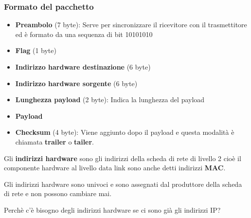 \documentclass[a4paper]{article}
\begin{document}
\subsubsection{Formato del pacchetto}
\label{05-12-D1}
\begin{itemize}
  \item \textbf{Preambolo} (7 byte): Serve per sincronizzare il ricevitore con il trasmettitore
    ed è formato da una sequenza di bit 10101010
  \item \textbf{Flag} (1 byte) 
  \item \textbf{Indirizzo hardware destinazione} (6 byte)
  \item \textbf{Indirizzo hardware sorgente} (6 byte)
  \item \textbf{Lunghezza payload} (2 byte): Indica la lunghezza del payload
  \item \textbf{Payload}
  \item \textbf{Checksum} (4 byte): Viene aggiunto dopo il payload e questa modalità
    è chiamata \textbf{trailer} o \textbf{tailer}.
\end{itemize}

\begin{definition}
  Gli \textbf{indirizzi hardware} sono gli indirizzi della scheda di rete di livello 2 
  cioè il componente hardware al livello data link sono anche detti indirizzi
  \textbf{MAC}.

  Gli indirizzi hardware sono univoci e sono assegnati dal produttore della scheda
  di rete e non possono cambiare mai.
\end{definition}

\vspace{1em}
\noindent
Perchè c'è bisogno degli indirizzi hardware se ci sono già gli indirizzi IP?
\end{document}
